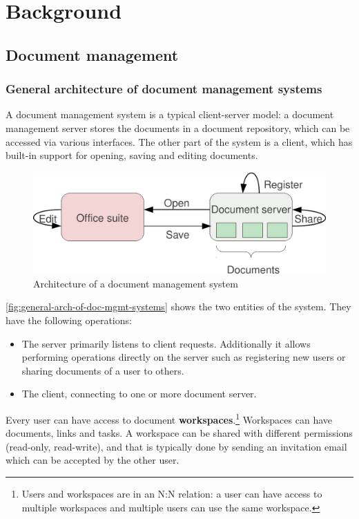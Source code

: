 \chapter{Background}

\section{Document management}

\subsection{General architecture of document management systems}

A document management system is a typical client-server model: a document
management server stores the documents in a document repository, which can be
accessed via various interfaces.  The other part of the system is a client,
which has built-in support for opening, saving and editing documents.

\begin{figure}[H]
\centering
\includegraphics[width=450px,keepaspectratio]{general-arch-of-doc-mgmt-systems.pdf}
\caption{Architecture of a document management system}
\label{fig:general-arch-of-doc-mgmt-systems}
\end{figure}

\autoref{fig:general-arch-of-doc-mgmt-systems} shows the two entities of the
system. They have the following operations:

\begin{itemize}
\item The server primarily listens to client requests. Additionally it allows
performing operations directly on the server such as registering new users or
sharing documents of a user to others.
\item The client, connecting to one or more document server.
\end{itemize}

Every user can have access to document \textbf{workspaces}.\footnote{Users and workspaces are in an N:N relation: a user can have access to multiple workspaces and multiple users can use the same workspace.} Workspaces can have documents,
links and tasks. A workspace can be shared with different permissions
(read-only, read-write), and that is typically done by sending an invitation
email which can be accepted by the other user.

